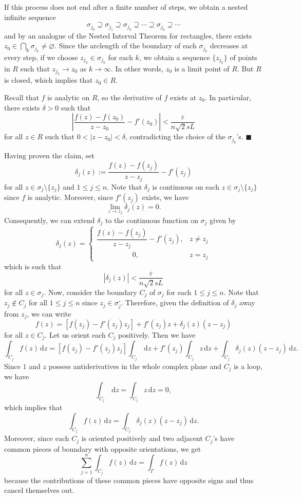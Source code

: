 \documentclass[10pt]{article}
\makeatletter
\newcommand{\eps}{\varepsilon}
\newcommand{\dd}{\,\mathrm{d}}
\theoremstyle{newstyle}
\newenvironment{pf}[1][\proofname]{\par
  \pushQED{\qed}%
  \normalfont \topsep0\p@\relax
  \trivlist
  \item[\hskip\labelsep\scshape
  #1\@addpunct{.}]\ignorespaces
}{%
  \popQED\endtrivlist\@endpefalse
}
\makeatother
\begin{document}
\begin{pf}
If this process does not end after a finite number of steps, we obtain a nested infinite sequence 
\[ \sigma_{j_0} \supseteq \sigma_{j_1} \supseteq \sigma_{j_2} \supseteq \cdots \supseteq 
\sigma_{j_k} \supseteq \cdots \]
and by an analogue of the Nested Interval Theorem for rectangles, there exists 
$z_0 \in \bigcap_k \sigma_{j_k} \neq \varnothing$. Since the arclength of the boundary of 
each $\sigma_{j_k}$ decreases at every step, if we choose $z_{j_k} \in \sigma_{j_k}$ for each $k$, 
we obtain a sequence $\{z_{j_k}\}$ of points in $R$ such that $z_{j_k} \to z_0$ as 
$k \to \infty$. In other words, $z_0$ is a limit point of $R$. But $R$ is closed, which implies that 
$z_0 \in R$. 

Recall that $f$ is analytic on $R$, so the derivative of $f$ exists at $z_0$. 
In particular, there exists $\delta > 0$ such that 
\[ \left| \frac{f(z) - f(z_0)}{z - z_0} - f'(z_0) \right| < \frac{\eps}{n\sqrt2 sL} \]
for all $z \in R$ such that $0 < |z - z_0| < \delta$, contradicting the choice of the 
$\sigma_{j_k}$'s. \hfill $\blacksquare$

Having proven the claim, set 
\[ \delta_j(z) := \frac{f(z) - f(z_j)}{z - z_j} - f'(z_j) \]
for all $z \in \sigma_j \setminus \{z_j\}$ and $1 \leq j \leq n$. Note that 
$\delta_j$ is continuous on each $z \in \sigma_j \setminus \{z_j\}$ since 
$f$ is analytic. Moreover, since $f'(z_j)$ exists, we have 
\[ \lim_{z\to z_j} \delta_j(z) = 0. \]
Consequently, we can extend $\delta_j$ to the continuous function on $\sigma_j$ given by 
\[ \delta_j(z) = \begin{cases} \dfrac{f(z) - f(z_j)}{z-z_j} - f'(z_j), & z \neq z_j \\ 
\qquad\qquad\quad  0, & z = z_j \end{cases} \]
which is such that 
\[ |\delta_j(z)| < \frac{\eps}{n\sqrt2 sL} \]
for all $z \in \sigma_j$. 
Now, consider the boundary $C_j$ of $\sigma_j$ for each $1 \leq j \leq n$. Note that $z_j \notin 
C_j$ for all $1 \leq j \leq n$ since $z_j \in \sigma_j^\circ$. Therefore, given the definition of 
$\delta_j$ away from $z_j$, we can write 
\[ f(z) = [f(z_j) - f'(z_j)z_j] + f'(z_j)z + \delta_j(z)(z-z_j) \]
for all $z \in C_j$. Let us orient each $C_j$ positively. Then we have 
\[ \int_{C_j} f(z)\dd z = [f(z_j) - f'(z_j)z_j] \int_{C_j} \dd z + 
f'(z_j) \int_{C_j} z\dd z + \int_{C_j} \delta_j(z)(z - z_j)\dd z. \]
Since $1$ and $z$ possess antiderivatives in the whole complex plane and $C_j$ is a loop, we have 
\[ \int_{C_j} \dd z = \int_{C_j} z \dd z = 0, \]
which implies that 
\[ \int_{C_j} f(z)\dd z = \int_{C_j} \delta_j(z)(z - z_j)\dd z. \]
Moreover, since each $C_j$ is oriented positively and two adjacent 
$C_j$'s have common pieces of boundary with opposite orientations, we get 
\[ \sum_{j=1}^n \int_{C_j} f(z)\dd z = \int_\Gamma f(z)\dd z \]
because the contributions of these common pieces have opposite signs and thus cancel themselves out. 


\end{pf}
\end{document}
